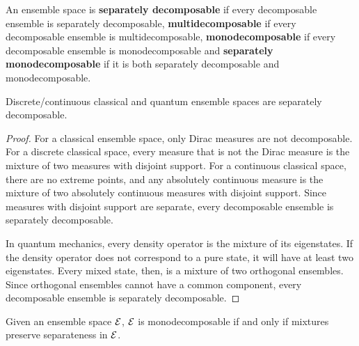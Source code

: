 \begin{mathSection}
\begin{defn}
	An ensemble space is \textbf{separately decomposable} if every decomposable ensemble is separately decomposable, \textbf{multidecomposable} if every decomposable ensemble is multidecomposable, \textbf{monodecomposable} if every decomposable ensemble is monodecomposable and \textbf{separately monodecomposable} if it is both separately decomposable and monodecomposable.
\end{defn}

\begin{prop}
	Discrete/continuous classical and quantum ensemble spaces are separately decomposable.
\end{prop}

\begin{proof}
	For a classical ensemble space, only Dirac measures are not decomposable. For a discrete classical space, every measure that is not the Dirac measure is the mixture of two measures with disjoint support. For a continuous classical space, there are no extreme points, and any absolutely continuous measure is the mixture of two absolutely continuous measures with disjoint support. Since measures with disjoint support are separate, every decomposable ensemble is separately decomposable.
	
	In quantum mechanics, every density operator is the mixture of its eigenstates. If the density operator does not correspond to a pure state, it will have at least two eigenstates. Every mixed state, then, is a mixture of two orthogonal ensembles. Since orthogonal ensembles cannot have a common component, every decomposable ensemble is separately decomposable.
\end{proof}

\begin{prop}
	Given an ensemble space $\mathcal{E}$, $\mathcal{E}$ is monodecomposable if and only if mixtures preserve separateness in $\mathcal{E}$.
\end{prop}

\begin{figure}[H]
	\centering
\end{figure}


\end{mathSection}

